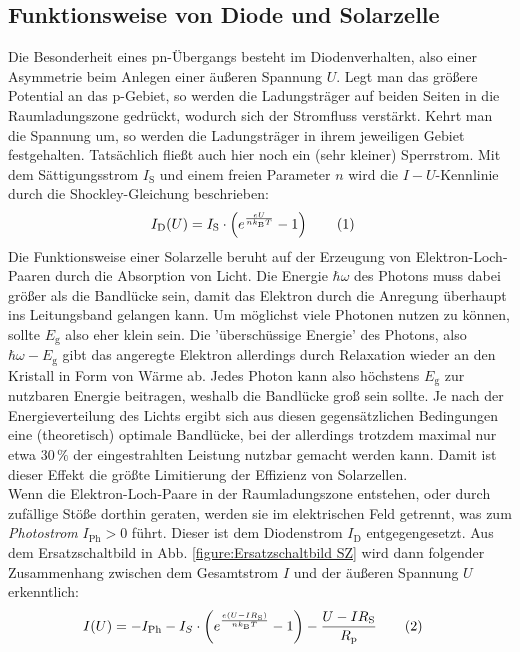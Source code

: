 \documentclass[german, parskip=full]{scrartcl}
\newcommand\numberthis{\addtocounter{equation}{1}\tag{\theequation}}
\newcommand{\kla}{}
\newcommand{\tecxt}{}
\begin{document}
\subsection{Funktionsweise von Diode und Solarzelle}
Die Besonderheit eines pn-Übergangs besteht im Diodenverhalten, also einer Asymmetrie beim Anlegen einer äußeren Spannung $U$. Legt man das größere Potential an das p-Gebiet, so werden die Ladungsträger auf beiden Seiten in die Raumladungszone gedrückt, wodurch sich der Stromfluss verstärkt. Kehrt man die Spannung um, so werden die Ladungsträger in ihrem jeweiligen Gebiet festgehalten. Tatsächlich fließt auch hier noch ein (sehr kleiner) Sperrstrom. Mit dem Sättigungsstrom $I_\tecxt\text{S}$ und einem freien Parameter $n$ wird die $I-U$-Kennlinie durch die Shockley-Gleichung beschrieben:
\begin{align*}
I_\tecxt\text{D}(U)&=I_\tecxt\text{S}\cdot\kla\left( {e^{\frac{eU}{nk_\tecxt\text{B}T}} - 1} \right)\numberthis\label{eqn:ID von U ideal}
\end{align*}
Die Funktionsweise einer Solarzelle beruht auf der Erzeugung von Elektron-Loch-Paaren durch die Absorption von Licht. Die Energie $\hbar\omega$ des Photons muss dabei größer als die Bandlücke sein, damit das Elektron durch die Anregung überhaupt ins Leitungsband gelangen kann. Um möglichst viele Photonen nutzen zu können, sollte $E_\tecxt\text{g}$ also eher klein sein. Die 'überschüssige Energie' des Photons, also $\hbar\omega -E_\tecxt\text{g}$ gibt das angeregte Elektron allerdings durch Relaxation wieder an den Kristall in Form von Wärme ab. Jedes Photon kann also höchstens $E_\tecxt\text{g}$ zur nutzbaren Energie beitragen, weshalb die Bandlücke groß sein sollte. Je nach der Energieverteilung des Lichts ergibt sich aus diesen gegensätzlichen Bedingungen eine (theoretisch) optimale Bandlücke, bei der allerdings trotzdem maximal nur etwa $30\,\%$ der eingestrahlten Leistung nutzbar gemacht werden kann. Damit ist dieser Effekt die größte Limitierung der Effizienz von Solarzellen.\\
Wenn die Elektron-Loch-Paare in der Raumladungszone entstehen, oder durch zufällige Stöße dorthin geraten, werden sie im elektrischen Feld getrennt, was zum \emph{Photostrom} $I_\tecxt\text{Ph}>0$ führt. Dieser ist dem Diodenstrom $I_\tecxt\text{D}$ entgegengesetzt. Aus dem Ersatzschaltbild in Abb. \ref{figure:Ersatzschaltbild SZ} wird dann folgender Zusammenhang zwischen dem Gesamtstrom $I$ und der äußeren Spannung $U$ erkenntlich:
\begin{align*}
I(U)&=-I_\tecxt\text{Ph}-I_S\cdot\kla\left( {e^{\frac{e(U-IR_\tecxt\text{S})}{nk_\tecxt\text{B}T}} -1} \right)-\frac{U-IR_\tecxt\text{S}}{R_\tecxt\text{p}}\numberthis\label{eqn:I von U real}
\end{align*}
\end{document}
